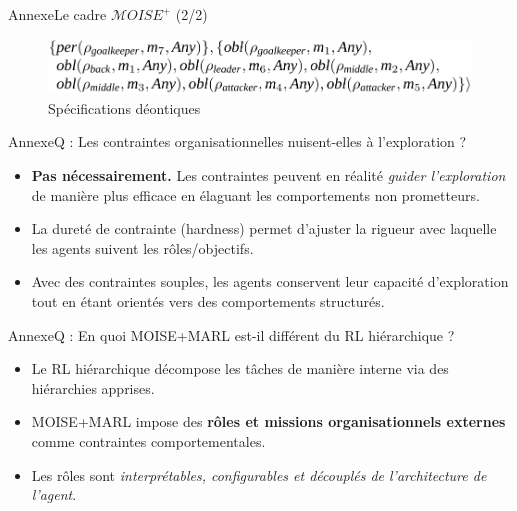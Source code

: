 \begin{frame}{Annexe}{Le cadre $\mathcal{M}OISE^+$ (2/2)}
    \ \\

    \begin{minipage}{\textwidth}
        \centering
        \begin{figure}[H]
            \centering
            \includegraphics[width=0.4\linewidth]{figures/soccer_ds.png}
            \caption*{Spécifications déontiques}
        \end{figure}
    \end{minipage}

\end{frame}

\begin{frame}{Annexe}{Q : Les contraintes organisationnelles nuisent-elles à l'exploration ?}
    \begin{itemize}
        \item \textbf{Pas nécessairement.} Les contraintes peuvent en réalité \textit{guider l'exploration} de manière plus efficace en élaguant les comportements non prometteurs.
        \item La dureté de contrainte (hardness) permet d’ajuster la rigueur avec laquelle les agents suivent les rôles/objectifs.
        \item Avec des contraintes souples, les agents conservent leur capacité d'exploration tout en étant orientés vers des comportements structurés.
    \end{itemize}
\end{frame}

\begin{frame}{Annexe}{Q : En quoi MOISE+MARL est-il différent du RL hiérarchique ?}
    \begin{itemize}
        \item Le RL hiérarchique décompose les tâches de manière interne via des hiérarchies apprises.
        \item MOISE+MARL impose des \textbf{rôles et missions organisationnels externes} comme contraintes comportementales.
        \item Les rôles sont \textit{interprétables, configurables et découplés de l’architecture de l’agent}.
    \end{itemize}
\end{frame}

